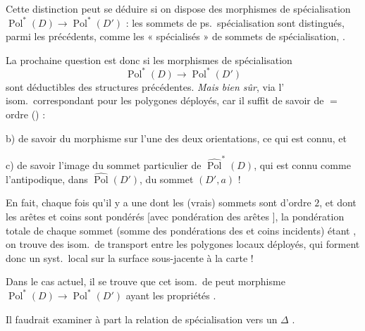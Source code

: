\documentclass[11pt,a4paper]{article}
\begin{document}
Cette distinction peut se déduire si on dispose des morphismes de spécialisation \struck{\ill{} \ill{}} $\operatorname{Pol}^{*}(D) \to \operatorname{Pol}^{*}(D')$ : les sommets de ps.\ spécialisation sont distingués, parmi les précédents, comme \struck{\ill{}} les « spécialisés » de sommets de spécialisation, .

La prochaine question est donc si les morphismes de spécialisation
\[
\operatorname{Pol}^{*}(D) \longrightarrow \operatorname{Pol}^{*}(D')
\]
sont déductibles des structures précédentes. \emph{Mais bien sûr}, via l'\struck{\ill{}} isom.\ correspondant pour les polygones déployés, car il suffit de savoir  \struck{\ill{}} de $=$ ordre () :

b) de savoir   du morphisme sur l'une des deux orientations, ce qui est connu, et

c) de savoir l'image du sommet  particulier de $\widehat{\operatorname{Pol}}^{*}(D)$, qui est connu comme l'antipodique, dans $\widehat{\operatorname{Pol}}(D')$, du sommet $(D', a)$ !

En fait, chaque fois qu'il y a une   dont les \struck{\ill{}} (vrais) sommets sont d'ordre $2$, et dont les arêtes et coins sont pondérés [avec pondération des arêtes ], \struck{\ill{}} la pondération totale de chaque sommet \struck{\ill{}} (somme des pondérations des  \struck{\ill{}} et coins incidents) étant , on trouve des isom.\ de transport entre les polygones locaux déployés, qui forment donc un syst.\ local sur la surface sous-jacente à la carte !

Dans le cas actuel, il se trouve que cet isom.\ de  peut \struck{\ill{}}   \ill{} morphisme $\operatorname{Pol}^{*}(D) \to \operatorname{Pol}^{*}(D')$ ayant les propriétés .

Il faudrait examiner à part la relation de spécialisation vers un $\Delta$ .
\end{document}

